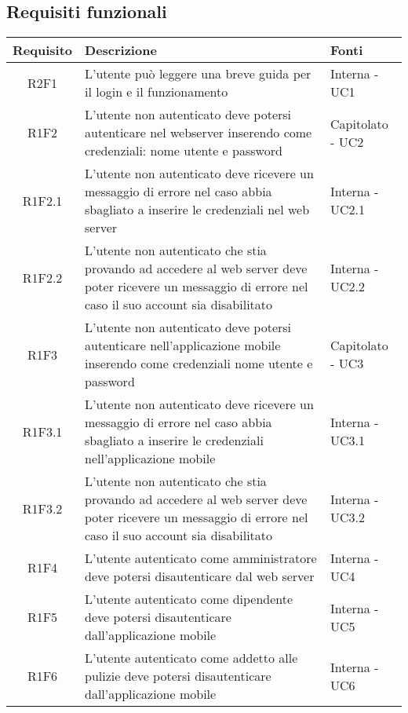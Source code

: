 \subsection{Requisiti funzionali}
\begin{center}
	\begin{longtable}{|c|p{10cm}|p{4cm}|}
		\hline
		\rowcolor{lighter-grayer}
		\textbf{Requisito} & \textbf{Descrizione} & \textbf{Fonti}  \\
		\hline
		\endhead
		
		
		 R2F1 & L'utente può leggere una breve guida per il login e il funzionamento & Interna - UC1 \\
		\hline
		R1F2	&	L'utente non autenticato deve potersi autenticare nel webserver inserendo come credenziali: nome utente e password & Capitolato - UC2	\\
		\hline
		R1F2.1	&	L'utente non autenticato deve ricevere un messaggio di errore nel caso abbia sbagliato a inserire le credenziali nel web server& Interna - UC2.1	\\
		\hline
		R1F2.2	&	L'utente non autenticato che stia provando ad accedere al web server deve poter ricevere un messaggio di errore nel caso il suo account sia disabilitato& Interna - UC2.2	\\
		\hline
		R1F3	&	L'utente non autenticato deve potersi autenticare nell'applicazione mobile inserendo come credenziali nome utente e password & Capitolato - UC3	\\
		\hline
		R1F3.1	&	L'utente non autenticato deve ricevere un messaggio di errore nel caso abbia sbagliato a inserire le credenziali nell'applicazione mobile& Interna - UC3.1	\\
		\hline
		R1F3.2	&	L'utente non autenticato che stia provando ad accedere al web server deve poter ricevere un messaggio di errore nel caso il suo account sia disabilitato& Interna - UC3.2	\\
		\hline
		R1F4	&	L'utente autenticato come amministratore deve potersi disautenticare dal web server& Interna - UC4	\\
		\hline
		R1F5	&	L'utente autenticato come dipendente deve potersi disautenticare dall'applicazione mobile& Interna - UC5	\\
		\hline
		R1F6	&	L'utente autenticato come addetto alle pulizie deve potersi disautenticare dall'applicazione mobile& Interna - UC6	\\

\end{longtable}
\end{center}
